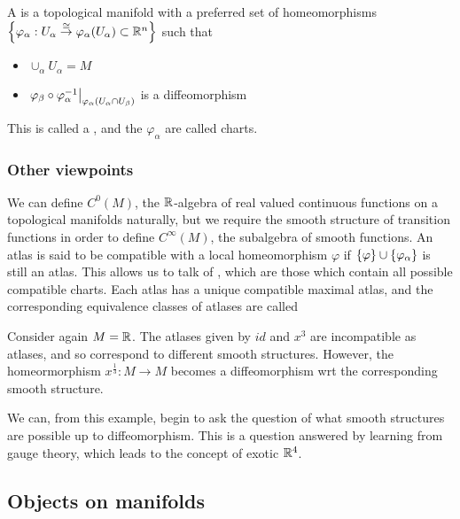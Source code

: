 \documentclass{article}
\begin{document}
\begin{definition}
A  is a topological manifold with a preferred set of homeomorphisms $\left\{ \varphi_\alpha: U_\alpha \overset{\cong}{\to} \varphi_\alpha(U_\alpha) \subset \mathbb{R}^n \right\}$ such that 
\begin{itemize}
    \item $\cup_\alpha U_\alpha = M$
    \item $\left. \varphi_\beta \circ \varphi_\alpha^{-1} \right\rvert_{\varphi_\alpha(U_\alpha \cap U_\beta)}$ is a diffeomorphism
\end{itemize}
This is called a , and the $\varphi_\alpha$ are called charts. 
\end{definition}

\subsubsection{Other viewpoints}
We can define $C^0(M)$, the $\mathbb{R}$-algebra of real valued continuous functions on a topological manifolds naturally, but we require the smooth structure of transition functions in order to define $C^\infty(M)$, the subalgebra of smooth functions. An atlas is said to be compatible with a local homeomorphism $\varphi$ if $\left\{ \varphi \right\} \cup \left\{ \varphi_\alpha \right\}$ is still an atlas. This allows us to talk of , which are those which contain all possible compatible charts. Each atlas has a unique compatible maximal atlas, and the corresponding equivalence classes of atlases are called 

\begin{example}
Consider again $M = \mathbb{R}$. The atlases given by $id$ and $x^3$ are incompatible as atlases, and so correspond to different smooth structures. However, the homeormorphism $x^\frac{1}{3}:M \to M$ becomes a diffeomorphism wrt the corresponding smooth structure.
\end{example}
We can, from this example, begin to ask the question of what smooth structures are possible up to diffeomorphism. This is a question answered by learning from gauge theory, which leads to the concept of exotic $\mathbb{R}^4$. 

\subsection{Objects on manifolds}
\end{document}

